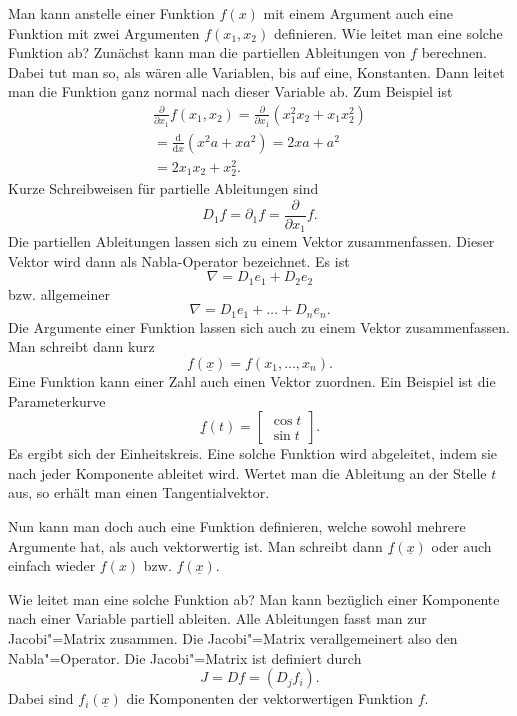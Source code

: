 \documentclass[a4paper,10pt,fleqn,twocolumn,twoside]{article}
\numberwithin{equation}{section}
\begin{document}
Man kann anstelle einer Funktion $f(x)$ mit einem Argument auch
eine Funktion mit zwei Argumenten $f(x_1,x_2)$ definieren. Wie
leitet man eine solche Funktion ab? Zunächst kann man die partiellen
Ableitungen von $f$ berechnen. Dabei tut man so, als wären alle
Variablen, bis auf eine, Konstanten. Dann leitet man die Funktion ganz
normal nach dieser Variable ab. Zum Beispiel ist
\begin{gather*}
\frac{\partial}{\partial x_1}f(x_1,x_2)
= \frac{\partial}{\partial x_1} (x_1^2x_2+x_1x_2^2)\\
= \frac{\mathrm d}{\mathrm dx} (x^2a+xa^2) = 2xa+a^2\\
= 2x_1x_2+x_2^2.
\end{gather*}
\noindent
Kurze Schreibweisen für partielle Ableitungen sind
\begin{equation}
D_1f = \partial_1f = \frac{\partial}{\partial x_1}f.
\end{equation}
\noindent
Die partiellen Ableitungen lassen sich zu einem Vektor zusammenfassen.
Dieser Vektor wird dann als Nabla-Operator bezeichnet. Es ist
\begin{equation}
\nabla = D_1e_1+D_2e_2
\end{equation}
\noindent
bzw. allgemeiner
\begin{equation}
\nabla = D_1e_1+\dots+D_ne_n.
\end{equation}
\noindent
Die Argumente einer Funktion lassen sich auch zu einem Vektor
zusammenfassen. Man schreibt dann kurz
\begin{equation}
f(\underline x) = f(x_1,\dots,x_n).
\end{equation}
\noindent
Eine Funktion kann einer Zahl auch einen Vektor zuordnen.
Ein Beispiel ist die Parameterkurve
\begin{equation}
\underline f(t) = \begin{bmatrix}\cos t\\ \sin t\end{bmatrix}.
\end{equation}
\noindent
Es ergibt sich der Einheitskreis. Eine solche Funktion wird
abgeleitet, indem sie nach jeder Komponente ableitet wird.
Wertet man die Ableitung an der Stelle $t$ aus, so erhält man
einen Tangentialvektor.

Nun kann man doch auch eine Funktion definieren, welche sowohl
mehrere Argumente hat, als auch vektorwertig ist. Man schreibt dann
$\underline f(\underline x)$ oder auch einfach wieder
$f(x)$ bzw. $f(\underline x)$.

Wie leitet man eine solche Funktion ab? Man kann bezüglich einer
Komponente nach einer Variable partiell ableiten. Alle Ableitungen
fasst man zur Jacobi"=Matrix zusammen. Die Jacobi"=Matrix
verallgemeinert also den Nabla"=Operator. Die Jacobi"=Matrix ist
definiert durch
\begin{equation}
J = Df = (D_j f_i).
\end{equation}
\noindent
Dabei sind $f_i(\underline x)$ die Komponenten der vektorwertigen
Funktion $f$.
\end{document}
